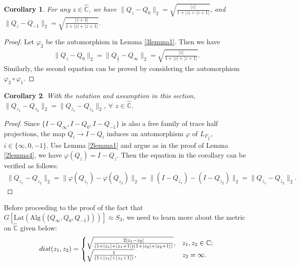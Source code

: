 \documentclass{amsart}
\newcommand{\Lat}{\mathrm{Lat}}
\newcommand{\Alg}{\mathrm{Alg}}
\newcommand{\C}{\mathbb C} %
\newtheorem{corollary}{Corollary}[section]
\begin{document}
\begin{corollary}
For any $z \in \widehat{\C}$, we have $\parallel Q_{z} - Q_{0} \parallel_{2} = \sqrt{\frac{|z|}{1+ |z|+|z+1|}}$, and
$\parallel Q_{z} - Q_{-1} \parallel_{2} = \sqrt{\frac{|z+1|}{1+ |z|+|z+1|}}$.
\end{corollary}

\begin{proof}
Let $\varphi_{2}$ be the automorphism in Lemma \ref{3lemma1}. Then we have
\begin{align*}
\parallel Q_{z} - Q_{0} \parallel_{2} =  \parallel Q_{\frac{1}{z}} - Q_{\infty} \parallel_{2} = \sqrt{\frac{|z|}{1+ |z|+|z+1|}}.
\end{align*}
Similarly, the second equation can be proved by considering the automorphism $\varphi_{2} \circ \varphi_{1}$.
\end{proof}


\begin{corollary}
With the notation and assumption in this section, $\| Q_{z_1} - Q_{z_2} \|_{2} = \| Q_{\overline{z}_1} - Q_{\overline{z}_2} \|_{2}$, $\forall$ $z \in \widehat{\C}$.
\end{corollary}

\begin{proof}
Since $\{I-Q_{\infty}, I-Q_{0}, I - Q_{-1} \}$ is also a free family of trace half projections,  the map $Q_{i} \rightarrow I - Q_{i}$ induces an automorphism $\varphi$ of $L_{F_{\frac{3}{2}}}$, 
$i \in \{\infty, 0, -1 \}$. Use Lemma \ref{2lemma1} and argue as in the proof of Lemma \ref{2lemma4}, we have $\varphi(Q_{z}) = I - Q_{\overline{z}}$. Then the equation in the corollary can be 
verified as follows: 
\begin{align*}
\| Q_{z_1} - Q_{z_2} \|_{2} = \| \varphi(Q_{z_1}) - \varphi(Q_{z_2}) \|_{2} =  \|(I - Q_{\overline{z}_1}) - (I - Q_{\overline{z}_2}) \|_{2}
=  \| Q_{\overline{z}_1} - Q_{\overline{z}_2} \|_{2}.
\end{align*}
\end{proof}

Before proceeding to the proof of the fact that $G[\Lat(\Alg( \{ Q_{\infty},  Q_{0}, Q_{-1} \}))] \approx S_3$, we need to learn more about 
the metric on $\widehat{\C}$ given below:
\begin{eqnarray}
dist(z_1, z_2)=
\begin{cases}
\sqrt{\frac{2|z_1 - z_2|}{(1+|z_1|+|z_1 +1|)(1+|z_2|+|z_2 +1|)}}, & z_1 , z_2  \in \C ; \cr 
\sqrt{\frac{1}{(1+|z_1|+|z_1 +1|)}} , & z_2 = \infty. 
\end{cases}
\end{eqnarray}
\end{document}
